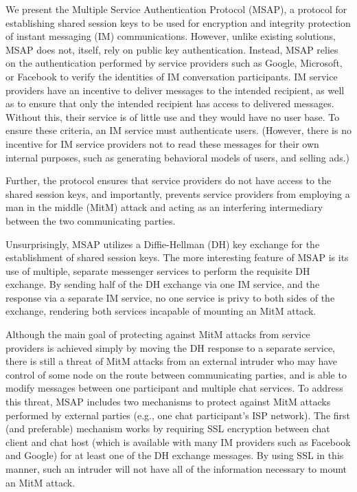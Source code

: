 \documentclass[twoside,10pt]{article}
\begin{document}
\begin{multicols}{2}
We present the Multiple Service Authentication Protocol (MSAP), a protocol for establishing shared session keys to be used for encryption and integrity protection of instant messaging (IM) communications.  However, unlike existing solutions, MSAP does not, itself, rely on public key authentication.  Instead, MSAP relies on the authentication performed by service providers such as Google, Microsoft, or Facebook to verify the identities of IM conversation participants.  IM service providers have an incentive to deliver messages to the intended recipient, as well as to ensure that only the intended recipient has access to delivered messages.  Without this, their service is of little use and they would have no user base.  To ensure these criteria, an IM service must authenticate users.  (However, there is no incentive for IM service providers not to read these messages for their own internal purposes, such as generating behavioral models of users, and selling ads.)

Further, the protocol ensures that service providers do not have access to the shared session keys, and importantly, prevents service providers from employing a man in the middle (MitM) attack and acting as an interfering intermediary between the two communicating parties.

Unsurprisingly, MSAP utilizes a Diffie-Hellman (DH) key exchange for the establishment of shared session keys.  The more interesting feature of MSAP is its use of multiple, separate messenger services to perform the requisite DH exchange.  By sending half of the DH exchange via one IM service, and the response via a separate IM service, no one service is privy to both sides of the exchange, rendering both services incapable of mounting an MitM attack.

Although the main goal of protecting against MitM attacks from service providers is achieved simply by moving the DH response to a separate service, there is still a threat of MitM attacks from an external intruder who may have control of some node on the route between communicating parties, and is able to modify messages between one participant and multiple chat services. To address this threat, MSAP includes two mechanisms to protect against MitM attacks performed by external parties (e.g., one chat participant's ISP network).  The first (and preferable) mechanism works by requiring SSL encryption between chat client and chat host (which is available with many IM providers such as Facebook and Google) for at least one of the DH exchange messages.  By using SSL in this manner, such an intruder will not have all of the information necessary to mount an MitM attack.


\end{multicols}
\end{document}

